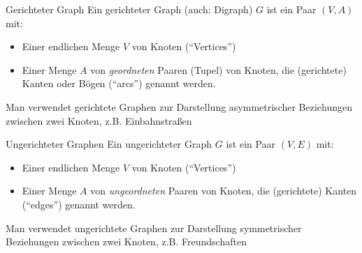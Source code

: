 \documentclass{panikzettel}
\begin{document}
\begin{halfboxl}
	\vspace{-\baselineskip}
	\begin{defi}{Gerichteter Graph}
		Ein gerichteter Graph (auch: Digraph) $G$ ist ein Paar $(V,A)$ mit:
		
		\begin{itemize}
			\item Einer endlichen Menge $V$ von Knoten (``Vertices'')
			
			\item Einer Menge $A$ von \emph{geordneten} Paaren (Tupel) von Knoten, die (gerichtete) Kanten oder Bögen (``arcs'') genannt werden.
		\end{itemize}
	
	Man verwendet gerichtete Graphen zur Darstellung asymmetrischer Beziehungen zwischen zwei Knoten, z.B. Einbahnstraßen 
	\end{defi}
\end{halfboxl}%
\begin{halfboxr}
	\vspace{-\baselineskip}
	\begin{defi}{Ungerichteter Graphen}
		Ein ungerichteter Graph $G$ ist ein Paar $(V,E)$ mit:
		
		\begin{itemize}
			\item Einer endlichen Menge $V$ von Knoten (``Vertices'')
			
			\item Einer Menge $A$ von \emph{ungeordneten} Paaren von Knoten, die (gerichtete) Kanten (``edges'') genannt werden.
		\end{itemize}
	
	Man verwendet ungerichtete Graphen zur Darstellung symmetrischer Beziehungen zwischen zwei Knoten, z.B. Freundschaften
	\end{defi}
\end{halfboxr}
\end{document}
